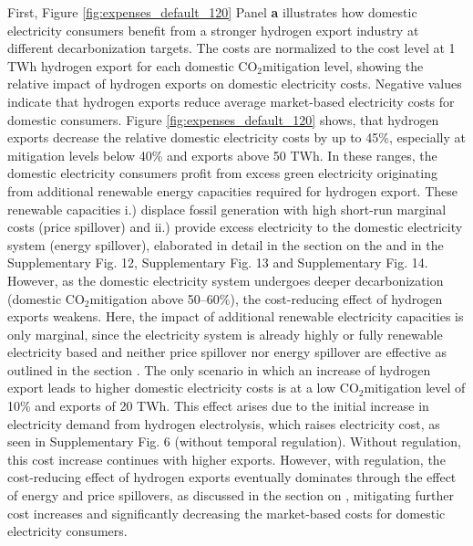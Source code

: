 \documentclass[5p,numafflabel]{elsarticle}
\newcommand{\co}{\ce{CO2}~}
\def\co{CO${}_2${\:}}
\begin{document}
First, Figure \ref{fig:expenses_default_120} Panel \textbf{a} illustrates how domestic electricity consumers benefit from a stronger hydrogen export industry at different decarbonization targets. The costs are normalized to the cost level at 1 TWh hydrogen export for each domestic \co mitigation level, showing the relative impact of hydrogen exports on domestic electricity costs. Negative values indicate that hydrogen exports reduce average market-based electricity costs for domestic consumers.
Figure \ref{fig:expenses_default_120} shows, that hydrogen exports decrease the relative domestic electricity costs by up to 45\%, especially at mitigation levels below 40\% and exports above 50 TWh. 
In these ranges, the domestic electricity consumers profit from excess green electricity originating from additional renewable energy capacities required for hydrogen export. These renewable capacities i.) displace fossil generation with high short-run marginal costs (price spillover) and ii.) provide excess electricity to the domestic electricity system (energy spillover), elaborated in detail in the section on the  and in the Supplementary Fig. 12, Supplementary Fig. 13 and Supplementary Fig. 14. %
However, as the domestic electricity system undergoes deeper decarbonization (domestic \co mitigation above 50--60\%), the cost-reducing effect of hydrogen exports weakens. Here, the impact of additional renewable electricity capacities is only marginal, since the electricity system is already highly or fully renewable electricity based and neither price spillover nor energy spillover are effective as outlined in the section .
The only scenario in which an increase of hydrogen export leads to higher domestic electricity costs is at a low \co mitigation level of 10\% and exports of 20 TWh.
This effect arises due to the initial increase in electricity demand from hydrogen electrolysis, which raises electricity cost, as seen in Supplementary Fig. 6 (without temporal regulation). %
Without regulation, this cost increase continues with higher exports. However, with regulation, the cost-reducing effect of hydrogen exports eventually dominates through the effect of energy and price spillovers, as discussed in the section on , mitigating further cost increases and significantly decreasing the market-based costs for domestic electricity consumers.
\end{document}
